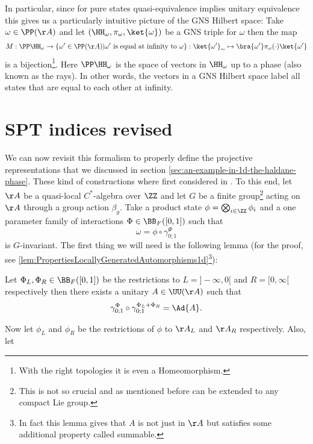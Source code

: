 In particular, since for pure states quasi-equivalence implies unitary equivalence this gives us a particularly intuitive picture of the GNS Hilbert space: Take $\omega\in\PP(\AA)$ and let $(\HH_\omega,\pi_\omega,\ket{\omega})$ be a GNS triple for $\omega$ then the map
\begin{equation}
M:\PP\HH_\omega\rightarrow \{\omega'\in\PP(\AA)|\omega'\text{ is equal at infinity to }\omega\}:\ket{\omega'}_\sim\mapsto \bra{\omega'}\pi_\omega(\cdot)\ket{\omega'}
\end{equation}
is a bijection\footnote{With the right topologies it is even a Homeomorphism.}. Here $\PP\HH_\omega$ is the space of vectors in $\HH_\omega$ up to a phase (also known as the rays). In other words, the vectors in a GNS Hilbert space label all states that are equal to each other at infinity.
\section{SPT indices revised}\label{sec:SPT_Indices_Revised}
We can now revisit this formalism to properly define the projective representations that we discussed in section \ref{sec:an-example-in-1d-the-haldane-phase}. These kind of constructions where first considered in \cite{ogata2021classification}. To this end, let $\AA$ be a quasi-local $C^*$-algebra over $\ZZ$ and let $G$ be a finite group\footnote{This is not so crucial and as mentioned before can be extended to any compact Lie group.} acting on $\AA$ through a group action $\beta_g$. Take a product state $\phi=\bigotimes_{i\in\ZZ}\phi_i$ and a one parameter family of interactions $\Phi\in \BB_F([0,1])$ such that
\begin{equation}
\omega=\phi\circ\gamma^\Phi_{0;1}
\end{equation}
is $G$-invariant. The first thing we will need is the following lemma (for the proof, see \ref{lem:PropertiesLocallyGeneratedAutomorphisms1d}\footnote{In fact this lemma gives that $A$ is not just in $\AA$ but satisfies some additional property called summable.}):
\begin{lemma}\label{lem:PropertiesLocallyGeneratedAutomorphisms1dIntroduction}
	Let $\Phi_L,\Phi_R\in\BB_F([0,1])$ be the restrictions to $L=]-\infty,0[$ and $R=[0,\infty[$ respectively then there exists a unitary $A\in\UU(\AA)$ such that
	\begin{equation}
	\gamma^\Phi_{0;1}\circ\gamma^{\Phi_L+\Phi_R}_{0;1}=\Ad{A}.
	\end{equation}
\end{lemma}
Now let $\phi_L$ and $\phi_R$ be the restrictions of $\phi$ to $\AA_L$ and $\AA_R$ respectively. Also, let
